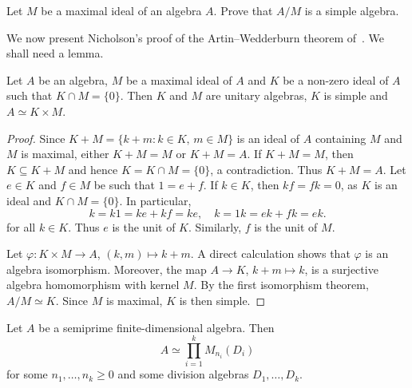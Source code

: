 \begin{exercise}
\label{xca:maximal}
    Let $M$ be a maximal ideal of an algebra $A$. Prove
    that $A/M$ is a simple algebra. 
\end{exercise}

We now present Nicholson's proof of the  
Artin--Wedderburn theorem of~\cite{MR1244013}. We shall need a lemma.

\begin{lemma}
    \label{lem:ArtinWedderburn}
    Let $A$ be an algebra, $M$ be a maximal ideal of $A$ and $K$ be a non-zero ideal of $A$ 
    such that $K\cap M=\{0\}$. Then $K$ and $M$ are unitary algebras, $K$ 
    is simple and $A\simeq K\times M$. 
\end{lemma}

\begin{proof}
    Since $K+M=\{k+m:k\in K,\,m\in M\}$ is an ideal of $A$ containing $M$ and   
    $M$ is maximal, either $K+M=M$ or $K+M=A$. If $K+M=M$, then $K\subseteq K+M$ and
    hence $K=K\cap M=\{0\}$, a contradiction. Thus $K+M=A$. Let $e\in K$ and $f\in M$ be such 
    that $1=e+f$. If $k\in K$, then 
    $kf=fk=0$, as $K$ is an ideal and $K\cap M=\{0\}$. In particular, 
    \[
    k=k1=ke+kf=ke,\quad 
    k=1k=ek+fk=ek.
    \]
    for all $k\in K$. Thus $e$ is the unit of $K$. Similarly, $f$ is the unit of $M$. 

    Let $\varphi\colon K\times M\to A$, $(k,m)\mapsto k+m$. A direct calculation shows that
    $\varphi$ is an algebra isomorphism. Moreover, 
    the map $A\to K$, $k+m\mapsto k$, is a surjective algebra homomorphism 
    with kernel $M$. By the first isomorphism theorem, $A/M\simeq K$. Since $M$ is maximal, 
    $K$ is then simple. 
\end{proof}

\begin{theorem}
    Let $A$ be a semiprime finite-dimensional algebra. Then 
    \[
    A\simeq\prod_{i=1}^kM_{n_i}(D_i)
    \]
    for some $n_1,\dots,n_k\geq0$ and some 
    division algebras $D_1,\dots,D_k$. 
\end{theorem}

